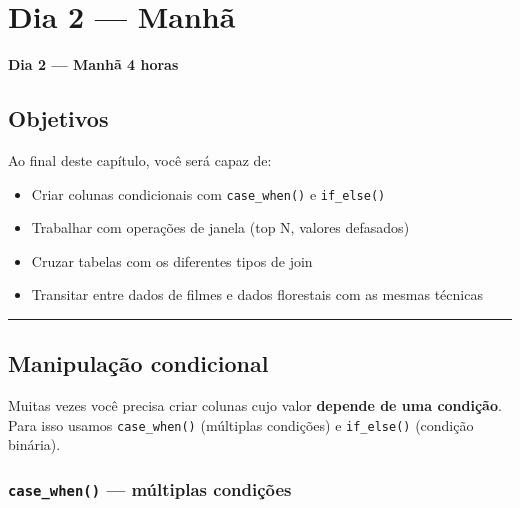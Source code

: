 \documentclass[
  letterpaper,
]{scrbook}
\begin{document}
\chapter{Dia 2 --- Manhã}\label{dia-2-manhuxe3-1}

\textbf{Dia 2 --- Manhã \textbar{} 4 horas}

\section*{Objetivos}\label{objetivos-2}


Ao final deste capítulo, você será capaz de:

\begin{itemize}
\item
  Criar colunas condicionais com \texttt{case\_when()} e
  \texttt{if\_else()}
\item
  Trabalhar com operações de janela (top N, valores defasados)
\item
  Cruzar tabelas com os diferentes tipos de join
\item
  Transitar entre dados de filmes e dados florestais com as mesmas
  técnicas
\end{itemize}

\begin{center}\rule{0.5\linewidth}{0.5pt}\end{center}

\section{Manipulação condicional}\label{manipulauxe7uxe3o-condicional}

Muitas vezes você precisa criar colunas cujo valor \textbf{depende de
uma condição}. Para isso usamos \texttt{case\_when()} (múltiplas
condições) e \texttt{if\_else()} (condição binária).

\subsection{\texorpdfstring{\texttt{case\_when()} --- múltiplas
condições}{case\_when() --- múltiplas condições}}\label{case_when-muxfaltiplas-condiuxe7uxf5es}
\end{document}
